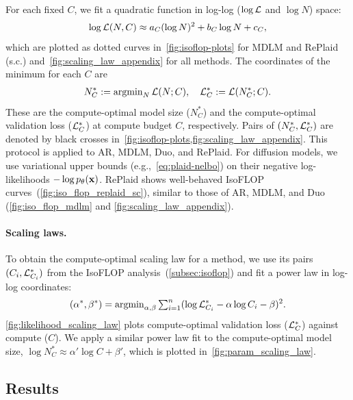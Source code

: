 \documentclass{article}
\begin{document}
For each fixed $C$, we fit a quadratic function in log-log ($\log \mathcal{L}$ and $\log N$) space:
\begin{align*}
    \log \mathcal{L}(N, C) \approx a_C (\log N)^2 + b_C \log N + c_C,
\end{align*}
which are plotted as dotted curves in~\cref{fig:isoflop-plots} for MDLM and RePlaid (s.c.) and~\cref{fig:scaling_law_appendix} for all methods. The coordinates of the minimum for each $C$ are
\begin{align*}
N^*_C := \operatorname*{argmin}\nolimits_N \mathcal{L}(N;C),\quad \mathcal{L}^*_C := \mathcal{L}(N^*_C; C).
\end{align*}
These are the compute-optimal model size ($N^*_C$) and the compute-optimal validation loss ($\mathcal{L}^*_C$) at compute budget $C$, respectively. Pairs of $(N^*_C, \mathcal{L}^*_C)$ are denoted by black crosses in~\cref{fig:isoflop-plots,fig:scaling_law_appendix}. This protocol is applied to AR, MDLM, Duo, and RePlaid. For diffusion models, we use variational upper bounds (e.g.,~\cref{eq:plaid-nelbo}) on their negative log-likelihoods $- \log p_\theta ({\mathbf x})$. RePlaid shows well-behaved IsoFLOP curves~(\cref{fig:iso_flop_replaid_sc}), similar to those of AR, MDLM, and Duo (\cref{fig:iso_flop_mdlm} and \cref{fig:scaling_law_appendix}).

%
%

\paragraph{Scaling laws.} To obtain the compute-optimal scaling law for a method, we use its pairs $(C_i, \mathcal{L}^*_{C_i})$ from the IsoFLOP analysis~(\cref{subsec:isoflop}) and fit a power law in log-log coordinates:
\begin{align*}
    (\alpha^*, \beta^*) = \operatorname*{argmin}\nolimits_{\alpha, \beta} {\textstyle\sum}_{i=1}^n (\log \mathcal{L}^*_{C_i} - \alpha \log C_i-\beta)^2.
\end{align*}\cref{fig:likelihood_scaling_law} plots compute-optimal validation loss ($\mathcal{L}^*_C$) against compute ($C$). We apply a similar power law fit to the compute-optimal model size, $\log N^*_C \approx \alpha' \log C + \beta'$, which is plotted in~\cref{fig:param_scaling_law}.

%

\subsection{Results}\label{subsec:scaling-law-results}
\end{document}

